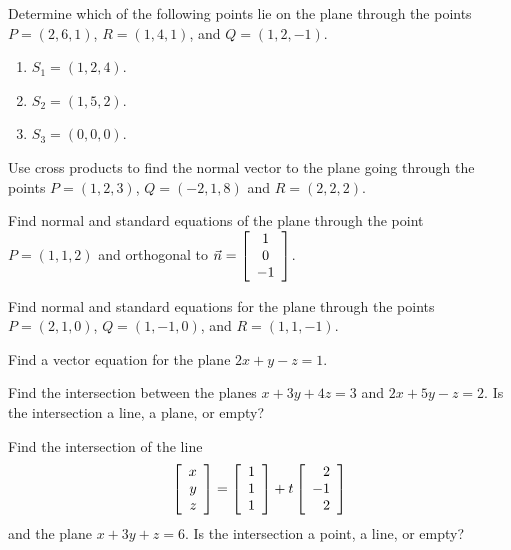 \documentclass{ximera}
\begin{document}
\begin{exercise}
  Determine which of the following points lie on the plane through the
  points $P = (2,6,1)$, $R = (1,4,1)$, and $Q = (1,2,-1)$.
  \begin{enumerate}
  \item $S_1=(1,2,4)$.
  \item $S_2=(1,5,2)$.
  \item $S_3=(0,0,0)$.
  \end{enumerate}
\end{exercise}

\begin{exercise}
  Use cross products to find the normal vector to the plane going
  through the points $P=(1,2,3)$, $Q=(-2,1,8)$ and $R=(2,2,2)$.
\end{exercise}

\begin{exercise}
  Find normal and standard equations of the plane through the
  point $P=(1,1,2)$ and orthogonal to $\vect{n}=\startmat{c} 1 \\ 0 \\ -1 \stopmat$.
\end{exercise}

\begin{exercise}
  Find normal and standard equations for the plane through the points
  $P = (2,1,0)$, $Q=(1,-1,0)$, and $R=(1,1,-1)$.
\end{exercise}

\begin{exercise}
  Find a vector equation for the plane $2x+y-z=1$.
\end{exercise}

\begin{exercise}
  Find the intersection between the planes $x+3y+4z=3$ and $2x+5y-z=2$.
  Is the intersection a line, a plane, or empty?
\end{exercise}

\begin{exercise}
  Find the intersection of the line
  \begin{equation*}
    \startmat{r} x \\ y \\ z \stopmat
    = \startmat{r} 1 \\ 1 \\ 1 \stopmat
    + t \startmat{r} 2 \\ -1 \\ 2 \stopmat
  \end{equation*}
  and the plane $x+3y+z = 6$.
  Is the intersection a point, a line, or empty?
\end{exercise}
\end{document}
